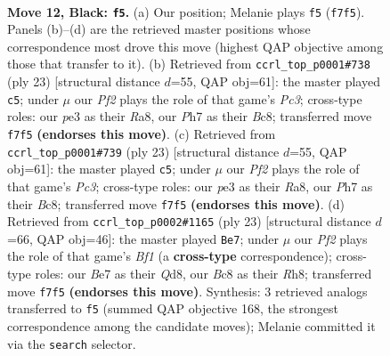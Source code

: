 \documentclass[11pt]{article}
\begin{document}
\begin{figure}[p]
\label{fig:thought-m21}
\end{figure}

\clearpage

\begin{figure}[p]\centering
\begin{subfigure}{0.46\textwidth}\centering
\resizebox{\linewidth}{!}{%
\newchessgame
\chessboard[
  setfen={rnbqk2r/pp2bppp/2p5/3p2P1/P2P1P1P/2N1P3/1P6/R2QKBNR b KQkq - 0 12},
  showmover=false,
  pgfstyle=straightmove, color=movearrow, markmove={f7-f5}
]}
\caption{}
\end{subfigure}\hfill
\begin{subfigure}{0.46\textwidth}\centering
\resizebox{\linewidth}{!}{%
\newchessgame
\chessboard[
  setfen={r1bqkb1r/p4pp1/2pp1n1p/8/1p2PB2/1P1P1N2/1PP1N1PP/R2Q1R1K b kq - 1 12},
  showmover=false,
  pgfstyle=straightmove, color=movearrow, markmove={c6-c5}
]}
\caption{}
\end{subfigure}
\\[4pt]
\begin{subfigure}{0.46\textwidth}\centering
\resizebox{\linewidth}{!}{%
\newchessgame
\chessboard[
  setfen={r1bqkb1r/p4pp1/2pp1n1p/8/1p2PB2/1P1P1N2/1PP1N1PP/R2Q1R1K b kq - 0 12},
  showmover=false,
  pgfstyle=straightmove, color=movearrow, markmove={c6-c5}
]}
\caption{}
\end{subfigure}\hfill
\begin{subfigure}{0.46\textwidth}\centering
\resizebox{\linewidth}{!}{%
\newchessgame
\chessboard[
  setfen={r2qkb1r/pp1n1pp1/2p1p3/4Pb1p/2BP3P/P1N1B3/1P3PP1/R2QK2R b KQkq - 0 12},
  showmover=false,
  pgfstyle=straightmove, color=movearrow, markmove={f8-e7}
]}
\caption{}
\end{subfigure}
\caption{\textbf{Move 12, Black: \texttt{f5}.} (a) Our position; Melanie plays \texttt{f5} (\texttt{f7f5}). Panels (b)--(d) are the retrieved master positions whose correspondence most drove this move (highest QAP objective among those that transfer to it). (b) Retrieved from \texttt{ccrl\_top\_p0001\#738} (ply 23) [structural distance $d$=55, QAP obj=61]: the master played \texttt{c5}; under $\mu$ our \emph{Pf2} plays the role of that game's \emph{Pc3}; cross-type roles: our \emph{p}e3 as their \emph{R}a8, our \emph{P}h7 as their \emph{B}c8; transferred move \texttt{f7f5} \textbf{(endorses this move)}. (c) Retrieved from \texttt{ccrl\_top\_p0001\#739} (ply 23) [structural distance $d$=55, QAP obj=61]: the master played \texttt{c5}; under $\mu$ our \emph{Pf2} plays the role of that game's \emph{Pc3}; cross-type roles: our \emph{p}e3 as their \emph{R}a8, our \emph{P}h7 as their \emph{B}c8; transferred move \texttt{f7f5} \textbf{(endorses this move)}. (d) Retrieved from \texttt{ccrl\_top\_p0002\#1165} (ply 23) [structural distance $d$=66, QAP obj=46]: the master played \texttt{Be7}; under $\mu$ our \emph{Pf2} plays the role of that game's \emph{Bf1} (a \textbf{cross-type} correspondence); cross-type roles: our \emph{B}e7 as their \emph{Q}d8, our \emph{B}c8 as their \emph{R}h8; transferred move \texttt{f7f5} \textbf{(endorses this move)}. Synthesis: 3 retrieved analogs transferred to \texttt{f5} (summed QAP objective 168, the strongest correspondence among the candidate moves); Melanie committed it via the \texttt{search} selector.}

\end{figure}
\end{document}
